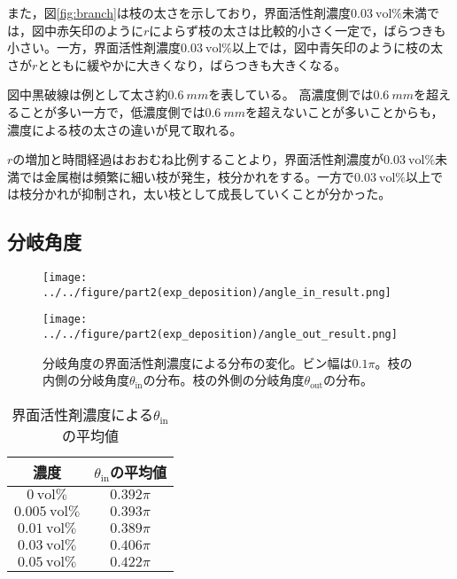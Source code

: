 \documentclass[autodetect-engine,dvi=dvipdfmx,a4paper,ja=standard,oneside,openany,11pt]{bxjsbook}
\begin{document}
また，図\ref{fig:branch}は枝の太さを示しており，界面活性剤濃度$\SI{0.03}{\mathrm{vol}\%}$未満では，図中赤矢印のように$r$によらず枝の太さは比較的小さく一定で，ばらつきも小さい。一方，界面活性剤濃度$\SI{0.03}{\mathrm{vol}\%}$以上では，図中青矢印のように枝の太さが$r$とともに緩やかに大きくなり，ばらつきも大きくなる。

図中黒破線は例として太さ約$\SI{0.6}{mm}$を表している。
高濃度側では$\SI{0.6}{mm}$を超えることが多い一方で，低濃度側では$\SI{0.6}{mm}$を超えないことが多いことからも，濃度による枝の太さの違いが見て取れる。

$r$の増加と時間経過はおおむね比例することより，界面活性剤濃度が$\SI{0.03}{\mathrm{vol}\%}$未満では金属樹は頻繁に細い枝が発生，枝分かれをする。一方で$\SI{0.03}{\mathrm{vol}\%}$以上では枝分かれが抑制され，太い枝として成長していくことが分かった。

\subsection{分岐角度}

\begin{figure}[htbp]
  \begin{minipage}
    {0.5\textwidth}
    \subcaption{}
    \centering
    \texttt{[image: ../../figure/part2(exp\_deposition)/angle\_in\_result.png]}
    \label{fig:angle_in}
  \end{minipage}
  \begin{minipage}
    {0.45\textwidth}
    \subcaption{}
    \centering
    \texttt{[image: ../../figure/part2(exp\_deposition)/angle\_out\_result.png]}
    \label{fig:angle_out}
  \end{minipage}
  \caption{分岐角度の界面活性剤濃度による分布の変化。ビン幅は$0.1\pi$。枝の内側の分岐角度$\theta_{\mathrm{in}}$の分布。枝の外側の分岐角度$\theta_{\mathrm{out}}$の分布。}
  \label{fig:angle}
\end{figure}

\begin{table}
  \centering
  \caption{界面活性剤濃度による$\theta_{\mathrm{in}}$の平均値}
  \begin{tabular}{|c|c|}
    \hline
    濃度                           & $\theta_{\mathrm{in}}$の平均値 \\
    \hline\hline
    $\SI{0}{\mathrm{vol}\%}$     & $0.392\pi$                 \\ \hline
    $\SI{0.005}{\mathrm{vol}\%}$ & $0.393\pi$                 \\ \hline
    $\SI{0.01}{\mathrm{vol}\%}$  & $0.389\pi$                 \\ \hline
    $\SI{0.03}{\mathrm{vol}\%}$  & $0.406\pi$                 \\ \hline
    $\SI{0.05}{\mathrm{vol}\%}$  & $0.422\pi$                 \\
    \hline
  \end{tabular}
  \label{tab:angle_average}
\end{table}
\end{document}
